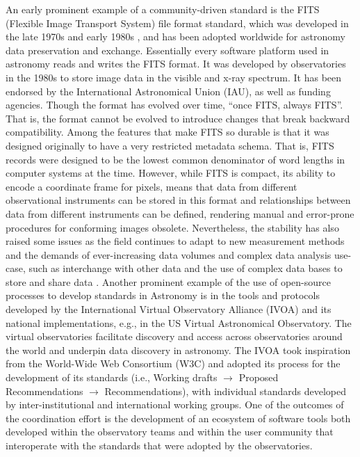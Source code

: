 \documentclass[
  number]{elsarticle}
\begin{document}
An early prominent example of a community-driven standard is the FITS
(Flexible Image Transport System) file format standard, which was
developed in the late 1970s and early 1980s \citep{wells1979fits}, and
has been adopted worldwide for astronomy data preservation and exchange.
Essentially every software platform used in astronomy reads and writes
the FITS format. It was developed by observatories in the 1980s to store
image data in the visible and x-ray spectrum. It has been endorsed by
the International Astronomical Union (IAU), as well as funding agencies.
Though the format has evolved over time, ``once FITS, always FITS''.
That is, the format cannot be evolved to introduce changes that break
backward compatibility. Among the features that make FITS so durable is
that it was designed originally to have a very restricted metadata
schema. That is, FITS records were designed to be the lowest common
denominator of word lengths in computer systems at the time. However,
while FITS is compact, its ability to encode a coordinate frame for
pixels, means that data from different observational instruments can be
stored in this format and relationships between data from different
instruments can be defined, rendering manual and error-prone procedures
for conforming images obsolete. Nevertheless, the stability has also
raised some issues as the field continues to adapt to new measurement
methods and the demands of ever-increasing data volumes and complex data
analysis use-case, such as interchange with other data and the use of
complex data bases to store and share data \citep{Scroggins2020-ut}.
Another prominent example of the use of open-source processes to develop
standards in Astronomy is in the tools and protocols developed by the
International Virtual Observatory Alliance (IVOA) and its national
implementations, e.g., in the US Virtual Astronomical
Observatory\citep{Hanisch2015-cu}. The virtual observatories facilitate
discovery and access across observatories around the world and underpin
data discovery in astronomy. The IVOA took inspiration from the
World-Wide Web Consortium (W3C) and adopted its process for the
development of its standards (i.e., Working drafts \(\rightarrow\)
Proposed Recommendations \(\rightarrow\) Recommendations), with
individual standards developed by inter-institutional and international
working groups. One of the outcomes of the coordination effort is the
development of an ecosystem of software tools both developed within the
observatory teams and within the user community that interoperate with
the standards that were adopted by the observatories.
\end{document}

